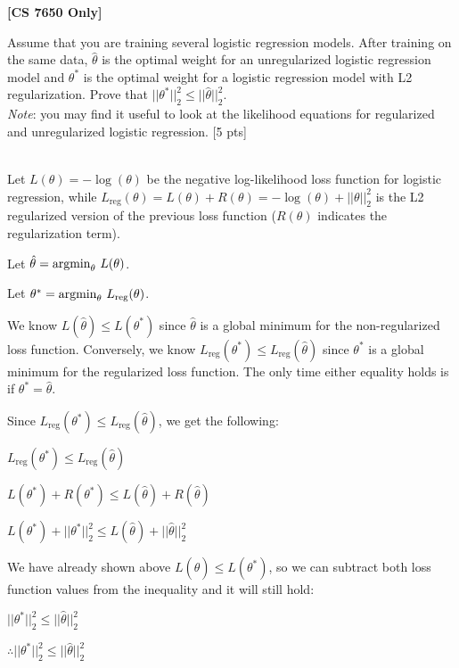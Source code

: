 \textbf{[CS 7650 Only]} 

Assume that you are training several logistic regression models.
After training on the same data, $\hat{\theta}$ is the optimal weight for an unregularized logistic regression model and $\theta^{*}$ is the optimal weight for a logistic regression model with L2 regularization.
Prove that $||\theta^{*}||^{2}_{2} \leq ||\hat{\theta}||^{2}_{2}$. \\
\emph{Note}: you may find it useful to look at the likelihood equations for regularized and unregularized logistic regression.
[5 pts]

\begin{solution} \ \\
	Let $L(\theta) = -\log(\theta)$ be the negative log-likelihood loss function for logistic regression, while $L_{\text{reg}}(\theta) = L(\theta) + R(\theta) = -\log(\theta) + ||\theta||^2_2$ is the L2 regularized version of the previous loss function ($R(\theta)$ indicates the regularization term).
	
	Let $\hat{\theta} = \text{argmin}_\theta \thinspace\thinspace L(\theta)$.
	
	Let $\theta^* = \text{argmin}_{\theta} \thinspace\thinspace L_{\text{reg}}(\theta)$.
	
	We know $L(\hat{\theta}) \leq L(\theta^*)$ since $\hat{\theta}$ is a global minimum for the non-regularized loss function. Conversely, we know $L_{\text{reg}}(\theta^*) \leq L_\text{reg}(\hat{\theta})$ since $\theta^*$ is a global minimum for the regularized loss function. The only time either equality holds is if $\theta^* = \hat{\theta}$.
	
	Since $L_{\text{reg}}(\theta^*) \leq L_\text{reg}(\hat{\theta})$, we get the following:
	
	$L_{\text{reg}}(\theta^*) \leq L_\text{reg}(\hat{\theta})$
	
	$L(\theta^*) + R(\theta^*) \leq L(\hat{\theta}) + R(\hat{\theta})$
	
	$L(\theta^*) + ||\theta^*||^2_2 \leq L(\hat{\theta}) + ||\hat{\theta}||^2_2$
	
	We have already shown above $L(\hat{\theta}) \leq L(\theta^*)$, so we can subtract both loss function values from the inequality and it will still hold:
	
	$||\theta^*||^2_2 \leq ||\hat{\theta}||^2_2$
	
	$\therefore ||\theta^{*}||^{2}_{2} \leq ||\hat{\theta}||^{2}_{2}$\\
\end{solution}
